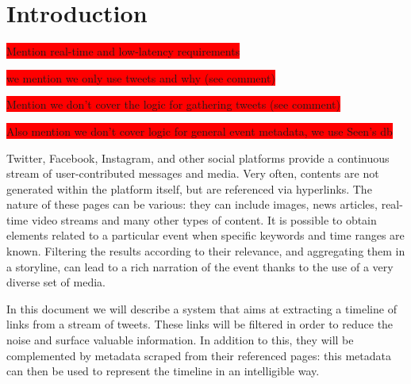 \documentclass{sig-alternate}
\newcommand{\todo}[1]{\colorbox{red}{#1}}
\begin{document}

\section{Introduction}
\label{sec:introduction}

\todo{Mention real-time and low-latency requirements}

\todo{we mention we only use tweets and why (see comment)}

\todo{Mention we don't cover the logic for gathering tweets (see comment)}

\todo{Also mention we don't cover logic for general event metadata, we use Seen's db}


Twitter, Facebook, Instagram, and other social platforms provide a continuous stream of user-contributed messages and media. Very often, contents are not generated within the platform itself, but are referenced via hyperlinks. The nature of these pages can be various: they can include images, news articles, real-time video streams and many other types of content. It is possible to obtain elements related to a particular event when specific keywords and time ranges are known. Filtering the results according to their relevance, and aggregating them in a storyline, can lead to a rich narration of the event thanks to the use of a very diverse set of media.

In this document we will describe a system that aims at extracting a timeline of links from a stream of tweets. These links will be filtered in order to reduce the noise and surface valuable information. In addition to this, they will be complemented by metadata scraped from their referenced pages: this metadata can then be used to represent the timeline in an intelligible way.
\end{document}
